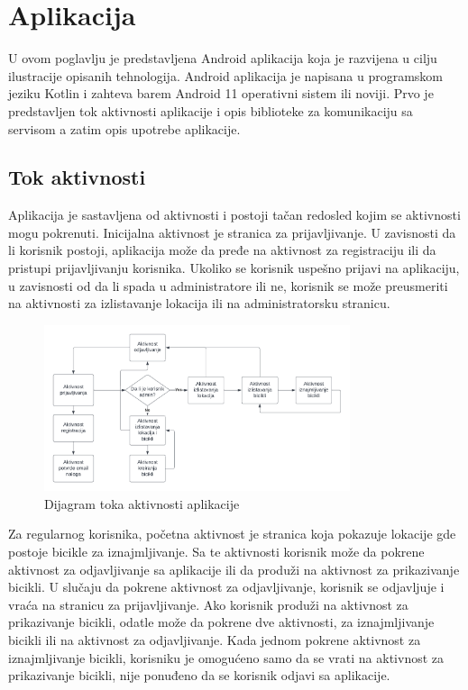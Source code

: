 \documentclass[12pt,oneside]{memoir}
\begin{document}
\section{Aplikacija}
U ovom poglavlju je predstavljena Android aplikacija koja je razvijena u cilju ilustracije opisanih tehnologija. Android aplikacija je napisana u programskom jeziku Kotlin i zahteva barem Android 11 operativni sistem ili noviji. Prvo je predstavljen tok aktivnosti aplikacije i opis biblioteke za komunikaciju sa servisom a zatim opis upotrebe aplikacije.

\subsection{Tok aktivnosti}

Aplikacija je sastavljena od aktivnosti i postoji tačan redosled kojim se aktivnosti mogu pokrenuti. Inicijalna aktivnost je stranica za prijavljivanje. U zavisnosti da li korisnik postoji, aplikacija može da pređe na aktivnost za registraciju ili da pristupi prijavljivanju korisnika. Ukoliko se korisnik uspešno prijavi na aplikaciju, u zavisnosti od da li spada u administratore ili ne, korisnik se može preusmeriti na aktivnosti za izlistavanje lokacija ili na administratorsku stranicu.

\begin{figure}[!ht]
  \centering
  \includegraphics[width=0.8\textwidth]{Organizacija aktivnosti.png}
  \caption{Dijagram toka aktivnosti aplikacije}
  \label{fig:tokAktivnostiApplikacije}
\end{figure}

Za regularnog korisnika, početna aktivnost je stranica koja pokazuje lokacije gde postoje bicikle za iznajmljivanje. Sa te aktivnosti korisnik može da pokrene aktivnost za odjavljivanje sa aplikacije ili da produži na aktivnost za prikazivanje bicikli. U slučaju da pokrene aktivnost za odjavljivanje, korisnik se odjavljuje i vraća na stranicu za prijavljivanje. Ako korisnik produži na aktivnost za prikazivanje bicikli, odatle može da pokrene dve aktivnosti, za iznajmljivanje bicikli ili na aktivnost za odjavljivanje. Kada jednom pokrene aktivnost za iznajmljivanje bicikli, korisniku je omogućeno samo da se vrati na aktivnost za prikazivanje bicikli, nije ponuđeno da se korisnik odjavi sa aplikacije.
\end{document}
